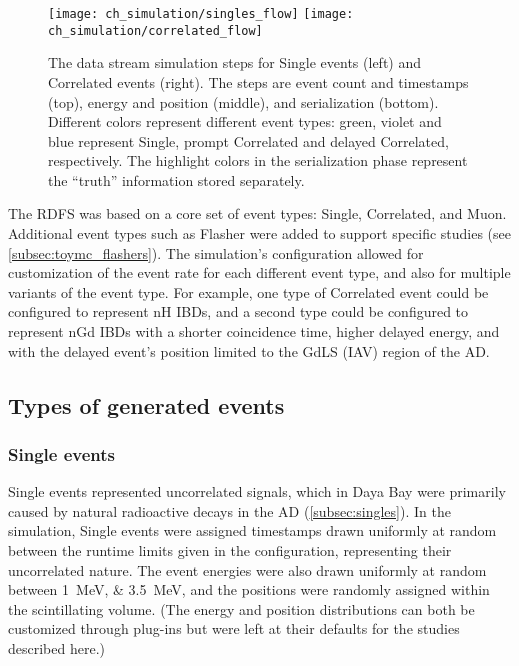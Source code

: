 \begin{figure}
    \centering
    \texttt{[image: ch\_simulation/singles\_flow]}
    \texttt{[image: ch\_simulation/correlated\_flow]}
    \caption[Data stream simulation diagram]{
        The data stream simulation steps
        for Single events (left) and Correlated events (right).
        The steps are event count and timestamps (top),
        energy and position (middle), and serialization (bottom).
        Different colors represent different event types:
        green, violet and blue represent Single,
        prompt Correlated and delayed Correlated,
        respectively.
        The highlight colors in the serialization phase
        represent the ``truth'' information stored separately.
    }
    \label{fig:my_toymc_flowchart}
\end{figure}


The RDFS was based on a core set of event types:
Single, Correlated, and Muon.
Additional event types such as Flasher were added to support specific studies
(see \cref{subsec:toymc_flashers}).
The simulation's configuration allowed for customization of the event rate
for each different event type,
and also for multiple variants of the event type.
For example, one type of Correlated event could be configured to represent nH IBDs,
and a second type could be configured to represent nGd IBDs
with a shorter coincidence time, higher delayed energy,
and with the delayed event's position limited to the GdLS (IAV) region of the AD.

\subsection{Types of generated events}

\subsubsection{Single events}

Single events represented uncorrelated signals,
which in Daya Bay were primarily caused by natural radioactive decays in the AD
(\cref{subsec:singles}).
In the simulation, Single events were assigned timestamps
drawn uniformly at random between the runtime limits given in the configuration,
representing their uncorrelated nature.
The event energies were also drawn uniformly at random
between \SIlist{1;3.5}{\MeV},
and the positions were randomly assigned
within the scintillating volume.
(The energy and position distributions can both be customized through plug-ins
but were left at their defaults for the studies described here.)

